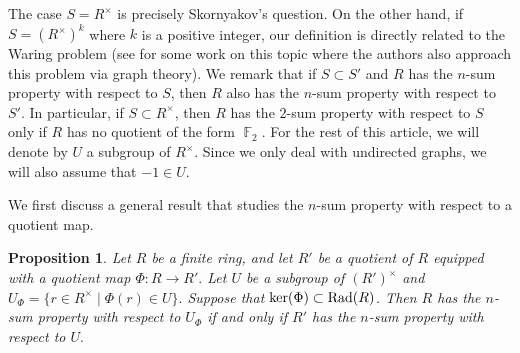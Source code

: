 \documentclass[11pt, a4paper]{amsart}
\newtheorem{prop}[thm]{Proposition}
\theoremstyle{definition}
\DeclareMathOperator{\F}{\mathbb{F}}
\numberwithin{equation}{section}
\newcommand{\Rad}{{\rm Rad}}
\begin{document}
The case $S=R^{\times}$ is precisely  Skornyakov's question. On the other hand, if $S=(R^{\times})^k$ where $k$ is a positive integer, our definition is directly related to the Waring problem (see \cite{podesta2021_finitefield, podesta2025GP, podesta_new} for some work on this topic where the authors also approach this problem via graph theory). We remark that if $S \subset S'$ and $R$ has the $n$-sum property with respect to $S$, then $R$ also has the $n$-sum property with respect to $S'.$ In particular, if $S \subset R^{\times}$, then $R$ has the $2$-sum property with respect to $S$ only if $R$ has no quotient of the form $\F_2.$ For the rest of this article, we will denote by $U$ a subgroup of $R^{\times}.$ Since we only deal with undirected graphs, we will also assume that $-1 \in U.$

We first discuss a general result that studies the $n$-sum property with respect to a quotient map. 
\begin{prop} \label{prop:infinitesiamal-quotient}
    Let $R$ be a finite ring, and let $R'$ be a quotient of $R$ equipped with a quotient map $\Phi\colon R \to R'.$  Let $U$ be a subgroup of $(R')^{\times}$ and $U_{\Phi} =\{r \in R^{\times} \mid \Phi(r) \in U \}.$ Suppose that $\ker(\Phi) \subset \Rad(R)$. Then $R$ has the $n$-sum property with respect to $U_{\Phi}$ if and only if $R'$ has the $n$-sum property with respect to $U.$
\end{prop}
\end{document}
